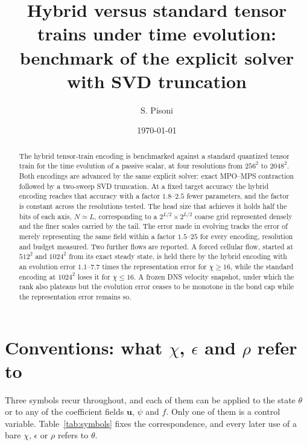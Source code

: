 \documentclass[aps,prfluids,reprint,onecolumn,amsmath,amssymb,nofootinbib,floatfix]{revtex4-2}
\begin{document}
\title{Hybrid versus standard tensor trains under time evolution:\\
benchmark of the explicit solver with SVD truncation}

\author{S. Pisoni}

\date{\today}

\begin{abstract}
The hybrid tensor-train encoding is benchmarked against a standard quantized
tensor train for the time evolution of a passive scalar, at four resolutions
from $256^2$ to $2048^2$. Both encodings are advanced by the same explicit
solver: exact MPO--MPS contraction followed by a two-sweep SVD truncation. At a
fixed target accuracy the hybrid encoding reaches that accuracy with a factor
$1.8$--$2.5$ fewer parameters, and the factor is constant across the resolutions
tested. The head size that achieves it holds half the bits of each axis,
$N\simeq L$, corresponding to a $2^{L/2}\times 2^{L/2}$ coarse grid represented
densely and the finer scales carried by the tail. The error made in evolving
tracks the error of merely representing the same field within a factor $1.5$--$25$
for every encoding, resolution and budget measured. Two further flows are
reported. A forced cellular flow, started at $512^2$ and $1024^2$ from its
exact steady state, is held there by the hybrid encoding with an evolution error
$1.1$--$7.7$ times the representation error for $\chi\ge16$, while the standard
encoding at $1024^2$ loses it for $\chi\le16$. A frozen DNS
velocity snapshot, under which the rank also plateaus but the evolution error
ceases to be monotone in the bond cap while the representation error remains so.
\end{abstract}

\maketitle

\section{\texorpdfstring{Conventions: what $\chi$, $\epsilon$ and $\rho$ refer to}{Conventions: what chi, eps and rho refer to}}
\label{sec:conventions}

Three symbols recur throughout, and each of them can be applied to the state
$\theta$ or to any of the coefficient fields $\mathbf{u}$, $\psi$ and $f$. Only
one of them is a control variable. Table~\ref{tab:symbols} fixes the
correspondence, and every later use of a bare $\chi$, $\epsilon$ or $\rho$
refers to $\theta$.
\end{document}
